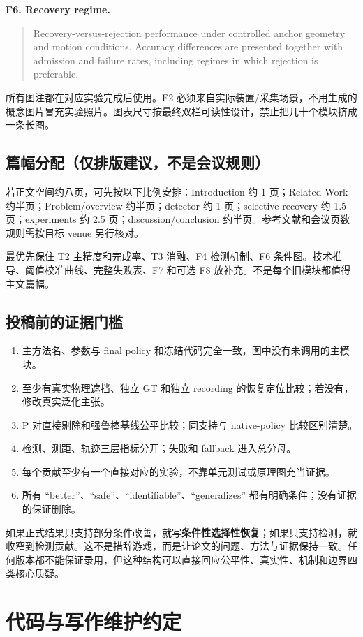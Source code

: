 \documentclass[UTF8,fontset=fandol,11pt,a4paper]{ctexart}
\newcommand{\eng}[1]{\begin{quote}\small #1\end{quote}}
\begin{document}
\textbf{F6. Recovery regime.}
\eng{Recovery-versus-rejection performance under controlled anchor geometry and motion conditions. Accuracy differences are presented together with admission and failure rates, including regimes in which rejection is preferable.}

所有图注都在对应实验完成后使用。F2 必须来自实际装置/采集场景，不用生成的概念图片冒充实验照片。图表尺寸按最终双栏可读性设计，禁止把几十个模块挤成一条长图。

\subsection{篇幅分配（仅排版建议，不是会议规则）}
若正文空间约八页，可先按以下比例安排：Introduction 约 1 页；Related Work 约半页；Problem/overview 约半页；detector 约 1 页；selective recovery 约 1.5 页；experiments 约 2.5 页；discussion/conclusion 约半页。参考文献和会议页数规则需按目标 venue 另行核对。

最优先保住 T2 主精度和完成率、T3 消融、F4 检测机制、F6 条件图。技术推导、阈值校准曲线、完整失败表、F7 和可选 F8 放补充。不是每个旧模块都值得主文篇幅。

\subsection{投稿前的证据门槛}
\begin{enumerate}
 \item 主方法名、参数与 final policy 和冻结代码完全一致，图中没有未调用的主模块。
 \item 至少有真实物理遮挡、独立 GT 和独立 recording 的恢复定位比较；若没有，修改真实泛化主张。
 \item P 对直接剔除和强鲁棒基线公平比较；同支持与 native-policy 比较区别清楚。
 \item 检测、测距、轨迹三层指标分开；失败和 fallback 进入总分母。
 \item 每个贡献至少有一个直接对应的实验，不靠单元测试或原理图充当证据。
 \item 所有 ``better''、``safe''、``identifiable''、``generalizes'' 都有明确条件；没有证据的保证删除。
\end{enumerate}

如果正式结果只支持部分条件改善，就写\textbf{条件性选择性恢复}；如果只支持检测，就收窄到检测贡献。这不是措辞游戏，而是让论文的问题、方法与证据保持一致。任何版本都不能保证录用，但这种结构可以直接回应公平性、真实性、机制和边界四类核心质疑。

\section{代码与写作维护约定}
\end{document}
